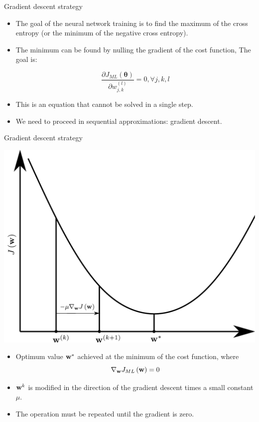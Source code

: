 \documentclass{beamer}
\begin{document}
\begin{frame}{Gradient descent strategy}
\begin{itemize}
    \item The goal of the neural network training is to find the maximum of the cross entropy (or the minimum of the negative cross entropy).
    
    \item  The minimum can be found by nulling the gradient of the cost function, The goal is:
    
    \begin{equation}
\frac{\partial J_{ML}({\boldsymbol\theta})}{\partial w^{(l)}_{j,k}} = 0, \forall j,k,l
\end{equation}
    \item This is an equation that cannot be solved in a single step.
    \item We need to proceed in sequential approximations: gradient descent. 
\end{itemize}     
\end{frame}

\begin{frame}{Gradient descent strategy}
\begin{multicols}{2}
    \includegraphics[scale=0.3]{Module 1 (NN)/pics/gradient_descent2.pdf} 
 
 \columnbreak
\begin{itemize}
\item Optimum value ${\bf w}^*$  achieved at the minimum of 
 the cost function, where
$$
\nabla_{\bf w} J_{ML}\left( {\bf w} \right) = 0
$$

\item ${\bf w}^k$ is modified in the direction of the gradient descent times a small constant $\mu$. 

\item The operation must be repeated until the gradient is zero. 
\end{itemize}    
\end{multicols}
\end{frame}
\end{document}
